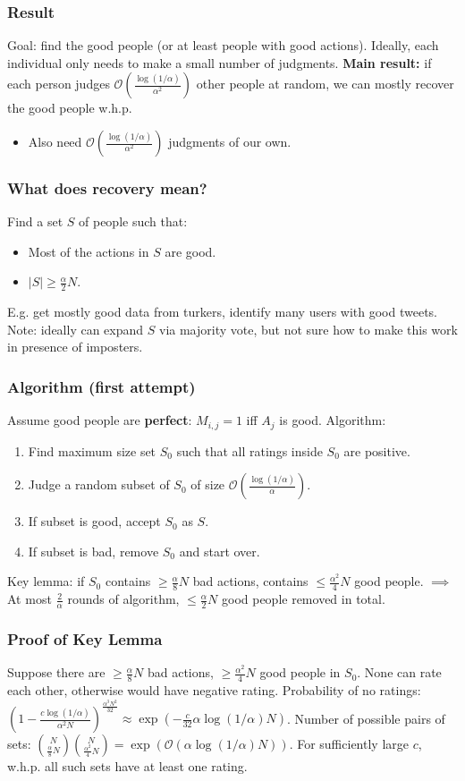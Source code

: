 \documentclass{beamer}
\newcommand{\oo}{\mathcal{O}}
\newcommand{\p}[1]{\left(#1\right)}
\begin{document}
\begin{frame}
\frametitle{Result}
Goal: find the good people (or at least people with good actions).
\pause
\vskip 0.2in
Ideally, each individual only needs to make a small number of judgments.
\pause
\vskip 0.2in
{\bf Main result:} if each person judges $\oo\p{\frac{\log(1/\alpha)}{\alpha^2}}$ other people 
at random, we can mostly recover the good people w.h.p.
\pause
\begin{itemize}
\item Also need $\oo\p{\frac{\log(1/\alpha)}{\alpha^2}}$ judgments of our own.
\end{itemize}
\end{frame}

\begin{frame}
\frametitle{What does recovery mean?}
Find a set $S$ of people such that:
\begin{itemize}
\item Most of the actions in $S$ are good.
\item $|S| \geq \frac{\alpha}{2}N$.
\end{itemize}
\pause
E.g. get mostly good data from turkers, identify many users with good tweets.
\pause
\vskip 0.2in
Note: ideally can expand $S$ via majority vote, but not sure how to 
make this work in presence of imposters.
\end{frame}

\begin{frame}
\frametitle{Algorithm (first attempt)}
Assume good people are \textbf{perfect}: $M_{i,j} = 1$ iff $A_j$ is good.
\pause
\vskip 0.2in
Algorithm:
\begin{enumerate}
\item Find maximum size set $S_0$ such that all ratings inside $S_0$ are positive.
\pause
\item Judge a random subset of $S_0$ of size $\oo\p{\frac{\log(1/\alpha)}{\alpha}}$.
\pause
\item If subset is good, accept $S_0$ as $S$.
\pause
\item If subset is bad, remove $S_0$ and start over.
\end{enumerate}
\pause
\vskip 0.2in
Key lemma: if $S_0$ contains $\geq \frac{\alpha}{8}N$ bad actions, contains 
$\leq \frac{\alpha^2}{4}N$ good people.
\pause
\vskip 0.01in
$\implies$ At most $\frac{2}{\alpha}$ rounds of algorithm, $\leq \frac{\alpha}{2}N$ good people removed in total.
\end{frame}

\begin{frame}
\frametitle{Proof of Key Lemma}
Suppose there are $\geq \frac{\alpha}{8}N$ bad actions, $\geq \frac{\alpha^2}{4}N$ good people in $S_0$.
\vskip 0.2in
None can rate each other, otherwise would have negative rating.
\vskip 0.2in
Probability of no ratings: $\p{1-\frac{c\log(1/\alpha)}{\alpha^2N}}^{\frac{\alpha^3N^2}{32}} \approx \exp\p{-\frac{c}{32}\alpha\log(1/\alpha) N}$.
\vskip 0.2in
Number of possible pairs of sets: $\binom{N}{\frac{\alpha}{8}N}\binom{N}{\frac{\alpha^2}{4}N} = \exp\p{\oo\p{\alpha\log(1/\alpha)N}}$.
\vskip 0.2in
For sufficiently large $c$, w.h.p. all such sets have at least one rating.
\end{frame}
\end{document}
